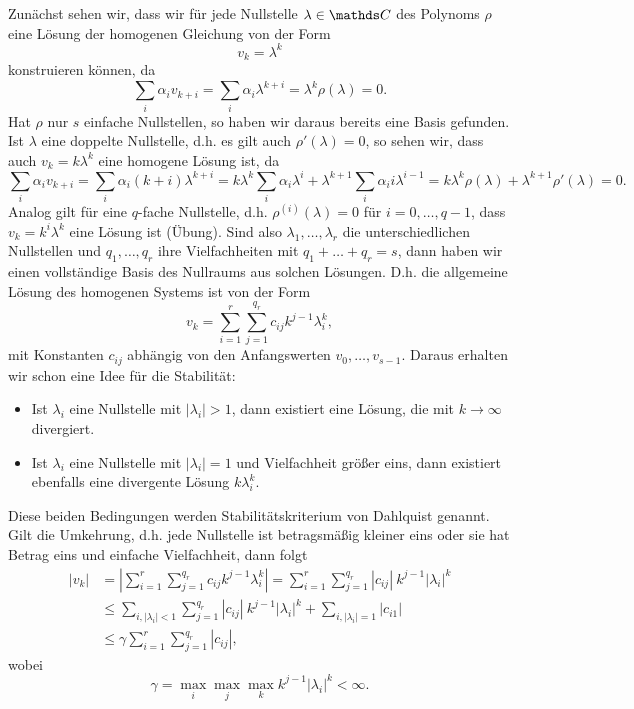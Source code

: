 Zunächst sehen wir, dass wir für jede Nullstelle $\lambda \in \C$ des Polynoms $\rho$ eine Lösung der homogenen Gleichung von der Form
$$ v_k = \lambda^k $$
konstruieren können, da
$$ \sum_i \alpha_i v_{k+i} =  \sum_i \alpha_i \lambda^{k+i} = \lambda^k \rho(\lambda) = 0. $$
Hat $\rho$ nur $s$ einfache Nullstellen, so haben wir daraus bereits eine Basis gefunden. Ist $\lambda$ eine doppelte Nullstelle, d.h. es gilt auch $\rho'(\lambda) =0$, so sehen wir, dass auch $v_k = k \lambda^k$ eine homogene Lösung ist,  da
$$ \sum_i \alpha_i   v_{k+i} =  \sum_i \alpha_i (k+i) \lambda^{k+i} =  k \lambda^k  \sum_i \alpha_i  \lambda^{i} +
\lambda^{k+1}  \sum_i \alpha_i  i\lambda^{i-1}   = k \lambda^k \rho(\lambda) + \lambda^{k+1} \rho'(\lambda)= 0. $$
Analog gilt für eine $q$-fache Nullstelle, d.h. $\rho^(i)(\lambda) = 0$ für $i=0,\ldots,q-1$, dass $v_k = k^i \lambda^k$ eine Lösung ist (Übung). Sind also $\lambda_1, \ldots, \lambda_r$ die unterschiedlichen Nullstellen und $q_1, \ldots,q_r$ ihre Vielfachheiten mit $q_1+\ldots+q_r = s$, dann haben wir einen vollständige Basis des Nullraums aus solchen Lösungen. D.h. die allgemeine Lösung des homogenen Systems ist von der Form
$$ v_k = \sum_{i=1}^r \sum_{j=1}^{q_r} c_{ij} k^{j-1} \lambda_i^k , $$
mit Konstanten $c_{ij}$ abhängig von den Anfangswerten $v_0, \ldots, v_{s-1}$. Daraus erhalten wir schon eine Idee für die Stabilität:
\begin{itemize}
\item Ist $\lambda_i$ eine Nullstelle mit $|\lambda_i|>1$, dann existiert eine Lösung, die mit $k \rightarrow \infty$ divergiert. 

\item Ist $\lambda_i$ eine Nullstelle mit $|\lambda_i|=1$ und Vielfachheit grö{\ss}er eins, dann existiert ebenfalls eine divergente Lösung $k \lambda_i^k$. 
\end{itemize} 
Diese beiden Bedingungen werden Stabilitätskriterium von Dahlquist genannt.
Gilt die Umkehrung, d.h. jede Nullstelle ist betragsmäßig kleiner eins oder sie hat Betrag eins und einfache Vielfachheit, dann folgt
%
\begin{align*}
\vert v_k \vert &= \left\vert \sum_{i=1}^r \sum_{j=1}^{q_r} c_{ij} k^{j-1} \lambda_i^k \right\vert = 
\sum_{i=1}^r \sum_{j=1}^{q_r} |c_{ij}|~ k^{j-1} |\lambda_i|^k  \\
&\leq \sum_{i,|\lambda_i|<1}  \sum_{j=1}^{q_r} |c_{ij}|~ k^{j-1} |\lambda_i|^k  + \sum_{i,|\lambda_i|=1}  |c_{i1}| \\
&\leq \gamma \sum_{i=1}^r\sum_{j=1}^{q_r} |c_{ij}|,
\end{align*}
%
wobei 
$$ \gamma = \max_i \max_j \max_k k^{j-1} |\lambda_i|^k < \infty. $$

